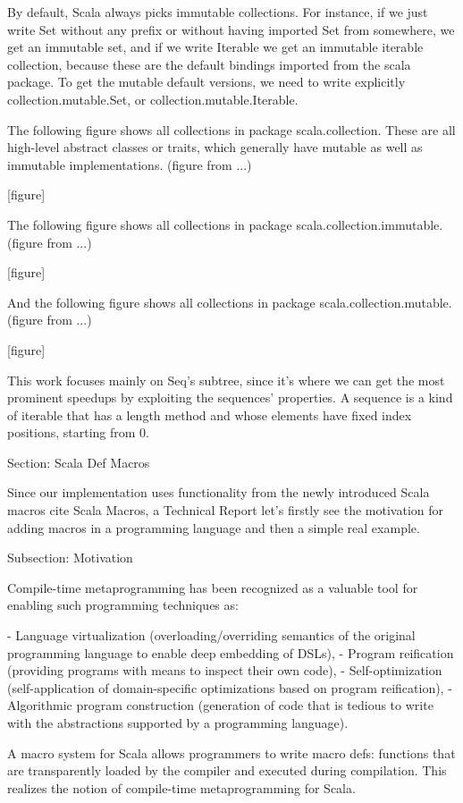 By default, Scala always picks immutable collections. For instance, if we just
write Set without any prefix or without having imported Set from somewhere, we
get an immutable set, and if we write Iterable we get an immutable iterable
collection, because these are the default bindings imported from the scala
package. To get the mutable default versions, we need to write explicitly
collection.mutable.Set, or collection.mutable.Iterable.

The following figure shows all collections in package scala.collection. These
are all high-level abstract classes or traits, which generally have mutable as
well as immutable implementations. (figure from ...)

[figure]

The following figure shows all collections in package
scala.collection.immutable. (figure from ...)

[figure]

And the following figure shows all collections in package
scala.collection.mutable. (figure from ...)

[figure]

This work focuses mainly on Seq's subtree, since it's where we can get the
most prominent speedups by exploiting the sequences' properties. A sequence is a
kind of iterable that has a length method and whose elements have fixed index
positions, starting from 0.


Section: Scala Def Macros

Since our implementation uses functionality from the newly introduced Scala
macros {cite Scala Macros, a Technical Report} let's firstly see the motivation
for adding macros in a programming language and then a simple real example.


Subsection: Motivation

Compile-time metaprogramming has been recognized as a valuable tool for enabling
such programming techniques as:

- Language virtualization (overloading/overriding semantics of the original
programming language to enable deep embedding of DSLs),
- Program reification (providing programs with means to inspect their own code),
- Self-optimization (self-application of domain-specific optimizations based on
program reification),
- Algorithmic program construction (generation of code that is tedious to write
with the abstractions supported by a programming language).

A macro system for Scala allows programmers to write macro defs: functions that
are transparently loaded by the compiler and executed during compilation. This
realizes the notion of compile-time metaprogramming for Scala.


